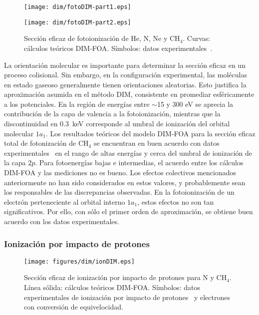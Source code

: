 \begin{figure}
\centering
\texttt{[image: dim/fotoDIM-part1.eps]} 

\vspace{-1.15cm}
\texttt{[image: dim/fotoDIM-part2.eps]}
\caption[Fotoionización de He, N, Ne y CH$_4$.]
{Sección eficaz de fotoionización de He, N, Ne y CH$_4$. Curvas: 
cálculos teóricos DIM-FOA. Símbolos: datos 
experimentales~\cite{Samson:90,Henke:93,Stolte:16,Samson:02,
Lukirskii:64,Henke:82,Samson:89}.}
\label{fig:photoDIM}
\end{figure}

La orientación molecular es importante para determinar la sección eficaz 
en un proceso colisional. Sin embargo, en la configuración experimental, 
las moléculas en estado gaseoso generalmente tienen orientaciones 
aleatorias. Esto justifica la aproximación asumida en el método DIM, 
consistente en promediar esféricamente a los potenciales. En la región 
de energías entre $\sim$15 y 300 eV se aprecia la contribución de la 
capa de valencia a la fotoionización, mientras que la discontinuidad en 
$0.3$~keV corresponde al umbral de ionización del orbital molecular 
$1a_1$. Los resultados teóricos del modelo DIM-FOA para la sección 
eficaz total de fotonización de CH$_4$ se encuentran en buen acuerdo con 
datos experimentales~\cite{Lukirskii:64,Henke:82,Samson:89} en el 
rango de altas energías y cerca del umbral de ionización de la capa 
$2p$. Para fotoenergías bajas e intermedias, el acuerdo entre los
cálculos DIM-FOA y las mediciones no es bueno. Los efectos 
colectivos mencionados anteriormente no han sido considerados en estos 
valores, y probablemente sean los responsables de las discrepancias 
observadas. En la fotoionización de un electrón perteneciente al orbital 
interno $1a_1$, estos efectos no son tan significativos. Por ello, con 
sólo el primer orden de aproximación, se obtiene buen acuerdo con los 
datos experimentales. 

\subsubsection{Ionización por impacto de protones}

\begin{figure}[t]
\centering
\texttt{[image: figures/dim/ionDIM.eps]}
\caption[Ionización por impacto de protón de N y CH$_4$.]
{Sección eficaz de ionización por impacto de protones para N y 
CH$_4$. Línea sólida: cálculos teóricos DIM-FOA. Símbolos: datos 
experimentales de ionización por impacto de 
protones~\cite{Rudd:83,Rudd:85} y electrones~\cite{Brook:78} con 
conversión de equivelocidad.}
\label{fig:iondim}
\end{figure}

